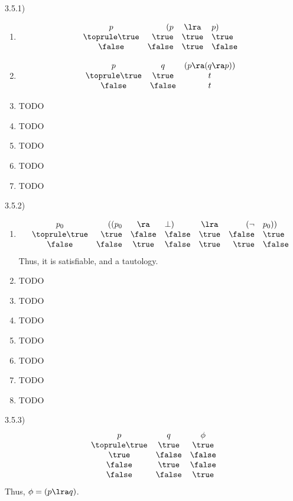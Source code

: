 3.5.1)
\begin{enumerate}
  \item
\[
  \begin{array}{crcl}
    p & (p & \lra & p) \\
    \toprule
    \true & \true & \true & \true \\
    \false & \false & \true & \false \\
  \end{array}
\]
  \item
\[
  \begin{array}{ccc}
    p & q & (p \ra (q \ra p)) \\
    \toprule
    \true & \true & t\\
    \false & \false & t\\
  \end{array}
\]
\item TODO
\item TODO
\item TODO
\item TODO
\item TODO
\end{enumerate}
3.5.2)
\begin{enumerate}
  \item
\[
  \begin{array}{crclcrl}
    p_0 & ((p_0 & \ra & \bot) & \lra & (\neg & p_0)) \\
    \toprule
    \true & \true & \false & \false & \true & \false & \true \\
    \false & \false & \true & \false & \true & \true & \false \\
  \end{array}
\]
Thus, it is satisfiable, and a tautology.
  \item TODO
  \item TODO
  \item TODO
  \item TODO
  \item TODO
  \item TODO
  \item TODO
\end{enumerate}

3.5.3)
\[
  \begin{array}{ccc}
    p & q & \phi \\
    \toprule
    \true & \true & \true \\
    \true & \false & \false \\
    \false & \true & \false \\
    \false & \false & \true \\
  \end{array}
\]
Thus, \(\phi = (p \lra q)\).

